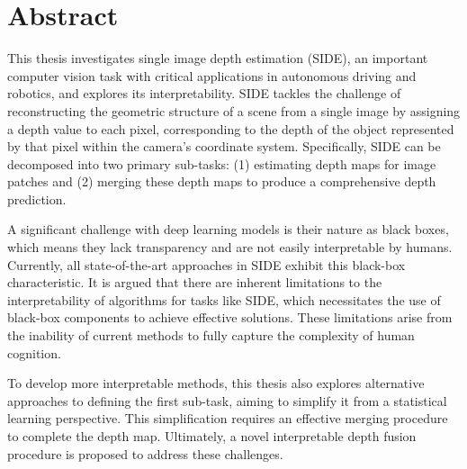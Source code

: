 \chapter*{Abstract}

This thesis investigates single image depth estimation (SIDE), an important computer vision task with critical applications in autonomous driving and robotics, and explores its interpretability.
SIDE tackles the challenge of reconstructing the geometric structure of a scene from a single image by assigning a depth value to each pixel, corresponding to the depth of the object represented by that pixel within the camera's coordinate system.
Specifically, SIDE can be decomposed into two primary sub-tasks: (1) estimating depth maps for image patches and (2) merging these depth maps to produce a comprehensive depth prediction.

A significant challenge with deep learning models is their nature as black boxes, which means they lack transparency and are not easily interpretable by humans.
Currently, all state-of-the-art approaches in SIDE exhibit this black-box characteristic.
It is argued that there are inherent limitations to the interpretability of algorithms for tasks like SIDE, which necessitates the use of black-box components to achieve effective solutions.
These limitations arise from the inability of current methods to fully capture the complexity of human cognition.

To develop more interpretable methods, this thesis also explores alternative approaches to defining the first sub-task, aiming to simplify it from a statistical learning perspective.
This simplification requires an effective merging procedure to complete the depth map.
Ultimately, a novel interpretable depth fusion procedure is proposed to address these challenges.

\thispagestyle{empty}
\mbox{}
\newpage
